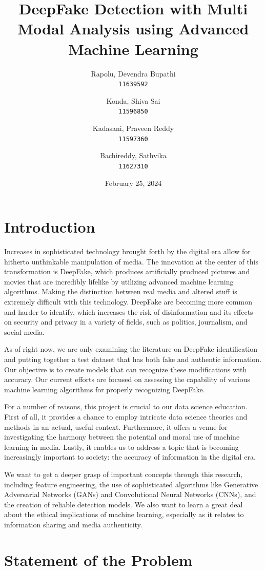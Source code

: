 \documentclass[12pt]{extarticle}
\title{DeepFake Detection with Multi Modal Analysis using Advanced Machine Learning}
\author{Rapolu, Devendra Bupathi\\
\texttt{11639592} 
\and Konda, Shiva Sai\\
\texttt{11596850}
\and Kadasani, Praveen Reddy \\
\texttt{11597360}
\and Bachireddy, Sathvika\\
\texttt{11627310}
}
\date{February 25, 2024}
\begin{document}
\maketitle
\section{Introduction}
Increases in sophisticated technology brought forth by the digital era allow for hitherto unthinkable manipulation of media. The innovation at the center of this transformation is DeepFake, which produces artificially produced pictures and movies that are incredibly lifelike by utilizing advanced machine learning algorithms. Making the distinction between real media and altered stuff is extremely difficult with this technology. DeepFake are becoming more common and harder to identify, which increases the risk of disinformation and its effects on security and privacy in a variety of fields, such as politics, journalism, and social media.

As of right now, we are only examining the literature on DeepFake identification and putting together a test dataset that has both fake and authentic information. Our objective is to create models that can recognize these modifications with accuracy. Our current efforts are focused on assessing the capability of various machine learning algorithms for properly recognizing DeepFake.

For a number of reasons, this project is crucial to our data science education. First of all, it provides a chance to employ intricate data science theories and methods in an actual, useful context. Furthermore, it offers a venue for investigating the harmony between the potential and moral use of machine learning in media. Lastly, it enables us to address a topic that is becoming increasingly important to society: the accuracy of information in the digital era.

We want to get a deeper grasp of important concepts through this research, including feature engineering, the use of sophisticated algorithms like Generative Adversarial Networks (GANs) and Convolutional Neural Networks (CNNs), and the creation of reliable detection models. We also want to learn a great deal about the ethical implications of machine learning, especially as it relates to information sharing and media authenticity.


\section{Statement of the Problem}
\end{document}
